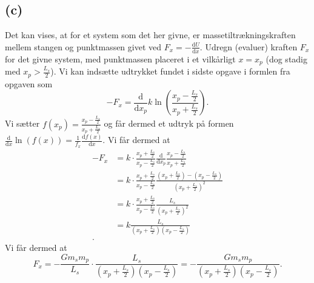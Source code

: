\documentclass[12pt]{article}
\theoremstyle{definition}
\begin{document}
\subsection*{(c)}
Det kan vises, at for et system som det her givne, er massetiltrækningskraften mellem stangen og punktmassen givet ved $F_x = - \frac{\mathrm{d}U}{\mathrm{d}x}$. Udregn (evaluer) kraften $F_x$ for det givne system, med punktmassen placeret i et vilkårligt $x = x_p$ (dog stadig med $x_p > \frac{L_s}{2}$).
\bigbreak
Vi kan indsætte udtrykket fundet i sidste opgave i formlen fra opgaven som
\[
  - F_x = \frac{\mathrm{d}}{\mathrm{d}x_p} k \ln \left( \frac{x_p - \frac{L_s}{2}}{x_p + \frac{L_s}{2}} \right)
.\]
Vi sætter $f(x_p) = \frac{x_p - \frac{L_s}{2}}{x_p + \frac{L_s}{2}}$ og får dermed et udtryk på formen $\frac{\mathrm{d}}{\mathrm{d}x} \ln(f(x)) = \frac{1}{f_x} \frac{\mathrm{d}f(x)}{\mathrm{d}x}$. Vi får dermed at
\begin{align*}
  -F_x &= k \cdot \frac{x_p + \frac{L_s}{2}}{x_p - \frac{L_s}{2}} \frac{\mathrm{d}}{\mathrm{d}x_p} \frac{x_p - \frac{L_s}{2}}{x_p + \frac{L_s}{2}} \\
  &= k \cdot \frac{x_p + \frac{L_s}{2}}{x_p - \frac{L_s}{2}} \frac{\left(x_p + \frac{L_s}{2} \right) - \left( x_p - \frac{L_s}{2} \right)}{\left( x_p + \frac{L_s}{2} \right)^2} \\
  &= k \cdot \frac{x_p + \frac{L_s}{2}}{x_p - \frac{L_s}{2}} \frac{L_s}{\left( x_p + \frac{L_s}{2} \right)^2} \\
  &= k \frac{L_s}{\left(x_p + \frac{L_s}{2} \right) \left( x_p - \frac{L_s}{2} \right)} \\
.\end{align*}
Vi får dermed at
\[ 
F_x = - \frac{Gm_s m_p}{L_s} \cdot \frac{L_s}{\left( x_p + \frac{L_s}{2} \right) \left( x_p - \frac{L_s}{2} \right)} = - \frac{Gm_sm_p}{\left( x_p + \frac{L_s}{2} \right) \left( x_p - \frac{L_s}{2} \right)}
.\]
\end{document}
